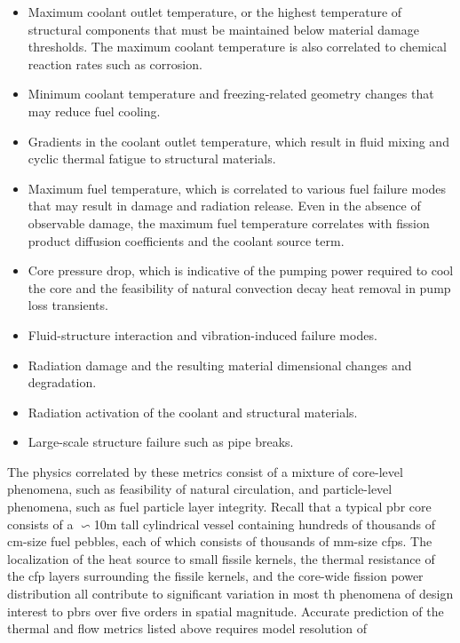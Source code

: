 \begin{itemize}
\item Maximum coolant outlet temperature, or the highest temperature of structural components that must be maintained below material damage thresholds. The maximum coolant temperature is also correlated to chemical reaction rates such as corrosion.
\item Minimum coolant temperature and freezing-related geometry changes that may reduce fuel cooling.
\item Gradients in the coolant outlet temperature, which result in fluid mixing and cyclic thermal fatigue to structural materials.
\item Maximum fuel temperature, which is correlated to various fuel failure modes that may result in damage and radiation release. Even in the absence of observable damage, the maximum fuel temperature correlates with fission product diffusion coefficients and the coolant source term.
\item Core pressure drop, which is indicative of the pumping power required to cool the core and the feasibility of natural convection decay heat removal in pump loss transients.
\item Fluid-structure interaction and vibration-induced failure modes.
\item Radiation damage and the resulting material dimensional changes and degradation.
\item Radiation activation of the coolant and structural materials.
\item Large-scale structure failure such as pipe breaks.
\end{itemize}

The physics correlated by these metrics consist of a mixture of core-level phenomena, such as feasibility of natural circulation, and particle-level phenomena, such as fuel particle layer integrity. Recall that a typical \gls{pbr} core consists of a $\backsim$10\si{\meter} tall cylindrical vessel containing hundreds of thousands of \si{\centi\meter}-size fuel pebbles, each of which consists of thousands of \si{\milli\meter}-size \glspl{cfp}. The localization of the heat source to small fissile kernels, the thermal resistance of the \gls{cfp} layers surrounding the fissile kernels, and the core-wide fission power distribution all contribute to significant variation in most \gls{th} phenomena of design interest to \glspl{pbr} over five orders in spatial magnitude. Accurate prediction of the thermal and flow metrics listed above requires model resolution of

